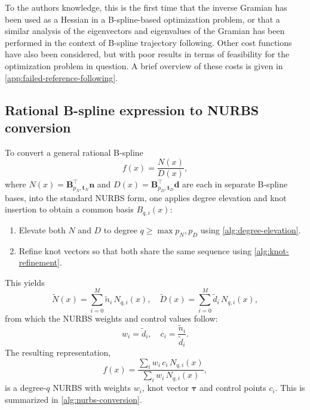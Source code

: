 To the authors knowledge, this is the first time that the inverse Gramian has been used as a Hessian in a B-spline-based optimization problem, or that a similar analysis of the eigenvectors and eigenvalues of the Gramian has been performed in the context of B-spline trajectory following. Other cost functions have also been considered, but with poor results in terms of feasibility for the optimization problem in question. A brief overview of these costs is given in \cref{app:failed-reference-following}.



\FloatBarrier
\subsection{Rational B-spline expression to NURBS conversion}\label{sec:nurbs-conversion}


To convert a general rational B-spline
$$
    f(x) = \frac{N(x)}{D(x)},
$$
where $N(x)=\mathbf B_{p_N,\mathbf t_N}^\top\mathbf n$ and $D(x)=\mathbf B_{p_D,\mathbf t_D}^\top\mathbf d$ are each in separate B-spline bases, into the standard NURBS form, one applies degree elevation and knot insertion \citep{Piegl1997} to obtain a common basis ${B_{q,i}(x)}$:
\begin{enumerate}
    \item Elevate both $N$ and $D$ to degree $q\ge\max{p_N,p_D}$ using \cref{alg:degree-elevation}.
    \item Refine knot vectors so that both share the same sequence using \cref{alg:knot-refinement}.
\end{enumerate}
This yields
$$
    \widetilde N(x) = \sum_{i=0}^M \tilde n_i\,N_{q,i}(x),\quad \widetilde D(x) = \sum_{i=0}^M \tilde d_i\,N_{q,i}(x),
$$
from which the NURBS weights and control values follow:
$$
    w_i = \tilde d_i, \quad
    c_i = \frac{\tilde n_i}{\tilde d_i}.
$$
The resulting representation,
$$
    f(x) = \frac{\sum_i w_i\,c_i\,N_{q,i}(x)}{\sum_i w_i\,N_{q,i}(x)},
$$
is a degree-$q$ NURBS with weights $w_i$, knot vector $\boldsymbol{\tau}$ and control points $c_i$. This is summarized in \cref{alg:nurbs-conversion}.

